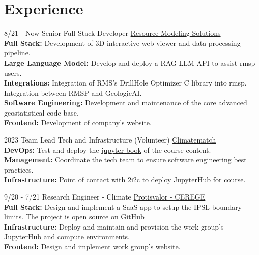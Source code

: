 \documentclass[]{friggeri-cv}
\begin{document}
\section{Experience}
\begin{entrylist}
	
	\entry
	{8/21 - Now}
	{Senior Full Stack Developer}
	{\href{https://resourcemodelingsolutions.com/}{Resource Modeling Solutions}}
	{
	\\[-0.5em]
	\textbf{Full Stack: }Development of 3D interactive web viewer and data processing pipeline.
	\\[3pt]
	\textbf{Large Language Model: }Develop and deploy a RAG LLM API to assist rmsp users. 
	\\[3pt]
	\textbf{Integrations: }Integration of RMS's DrillHole Optimizer C library into rmsp. Integration between RMSP and GeologicAI.
	\\[3pt]
	\textbf{Software Engineering: }Development and maintenance of the core advanced geostatistical code base.
	\\[3pt]
	\textbf{Frontend: }Development of \href{https://resourcemodelingsolutions.com}{company's website}.
	}

	\entry
	{2023}
	{Team Lead Tech and Infrastructure (Volunteer)}
	{\href{https://sites.google.com/climatematch.io/academy/about}{Climatematch}}
	{
		\\[-0.5em]
		\textbf{DevOps: }Test and deploy the \href{https://comptools.climatematch.io/tutorials/intro.html}{jupyter book} of the course content. 
		\\[3pt]
		\textbf{Management: }Coordinate the tech team to ensure software engineering best practices.
		\\[3pt]
		\textbf{Infrastructure: }Point of contact with \href{https://2i2c.org}{2i2c} to deploy JupyterHub for course.
	}
  
	\entry
	{9/20 - 7/21}
	{Research Engineer - Climate}
	{\href{https://paleoclim-cnrs.github.io/}{Protisvalor - CEREGE}}
	{
	\\[-0.5em]
	\textbf{Full Stack: } Design and implement a SaaS app to setup the IPSL boundary limits. The project is open source on \href{https://cerege-cl.github.io/netcdf_editor_app/}{GitHub}
	\\[3pt]
	\textbf{Infrastructure: } Deploy and maintain and provision the work group's JupyterHub and compute environments.
	\\[3pt]
	\textbf{Frontend: } Design and implement \href{https://paleoclim-cnrs.github.io}{work group's website}.
	}
	

\end{entrylist}
\end{document}

